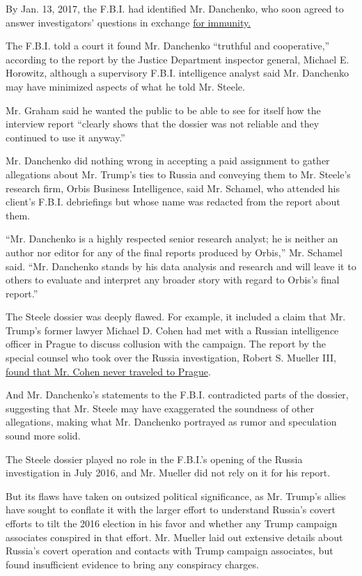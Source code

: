 By Jan. 13, 2017, the F.B.I. had identified Mr. Danchenko, who soon
agreed to answer investigators' questions in exchange
\href{https://www.justice.gov/archives/jm/criminal-resource-manual-719-informal-immunity-distinguished-formal-immunity}{for
immunity.}

The F.B.I. told a court it found Mr. Danchenko ``truthful and
cooperative,'' according to the report by the Justice Department
inspector general, Michael E. Horowitz, although a supervisory F.B.I.
intelligence analyst said Mr. Danchenko may have minimized aspects of
what he told Mr. Steele.

Mr. Graham said he wanted the public to be able to see for itself how
the interview report ``clearly shows that the dossier was not reliable
and they continued to use it anyway.''

Mr. Danchenko did nothing wrong in accepting a paid assignment to gather
allegations about Mr. Trump's ties to Russia and conveying them to Mr.
Steele's research firm, Orbis Business Intelligence, said Mr. Schamel,
who attended his client's F.B.I. debriefings but whose name was redacted
from the report about them.

``Mr. Danchenko is a highly respected senior research analyst; he is
neither an author nor editor for any of the final reports produced by
Orbis,'' Mr. Schamel said. ``Mr. Danchenko stands by his data analysis
and research and will leave it to others to evaluate and interpret any
broader story with regard to Orbis's final report.''

The Steele dossier was deeply flawed. For example, it included a claim
that Mr. Trump's former lawyer Michael D. Cohen had met with a Russian
intelligence officer in Prague to discuss collusion with the campaign.
The report by the special counsel who took over the Russia
investigation, Robert S. Mueller III,
\href{https://www.nytimes3xbfgragh.onion/interactive/2019/04/18/us/politics/mueller-report-document.html\#g-page-351}{found
that Mr. Cohen never traveled to Prague}.

And Mr. Danchenko's statements to the F.B.I. contradicted parts of the
dossier, suggesting that Mr. Steele may have exaggerated the soundness
of other allegations, making what Mr. Danchenko portrayed as rumor and
speculation sound more solid.

The Steele dossier played no role in the F.B.I.'s opening of the Russia
investigation in July 2016, and Mr. Mueller did not rely on it for his
report.

But its flaws have taken on outsized political significance, as Mr.
Trump's allies have sought to conflate it with the larger effort to
understand Russia's covert efforts to tilt the 2016 election in his
favor and whether any Trump campaign associates conspired in that
effort. Mr. Mueller laid out extensive details about Russia's covert
operation and contacts with Trump campaign associates, but found
insufficient evidence to bring any conspiracy charges.

